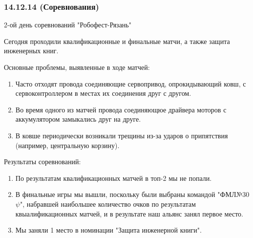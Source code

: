 \subsubsection{14.12.14 (Соревнования)}
\begin{center}
	2-ой день соревнований "Робофест-Рязань"
\end{center}
Сегодня проходили квалификационные и финальные матчи, а также защита инженерных книг.
\newline 

Основные проблемы, выявленные в ходе матчей:
\begin{enumerate}
	\item Часто отходят провода соединяющие сервопривод, опрокидывающий ковш, с сервоконтроллером в местах их соединения друг с другом.
	
	\item Во время одного из матчей провода соединяющюе драйвера моторов с аккумулятором замыкались друг на друге.
	
	\item В ковше периодически возникали трещины из-за ударов о припятствия (например, центральную корзину).
	
\end{enumerate}

Результаты соревнований:
\begin{enumerate}
	\item По результатам квалификационных матчей в топ-2 мы не попали.
	
	\item В финальные игры мы вышли, поскольку были выбраны командой "ФМЛ№30 ${\psi}$", набравшей наибольшее количество очков по результатам квыалификационных матчей, и в результате наш альянс занял первое место.
	
	\item Мы заняли 1 место в номинации "Защита инженерной книги".
\end{enumerate}

